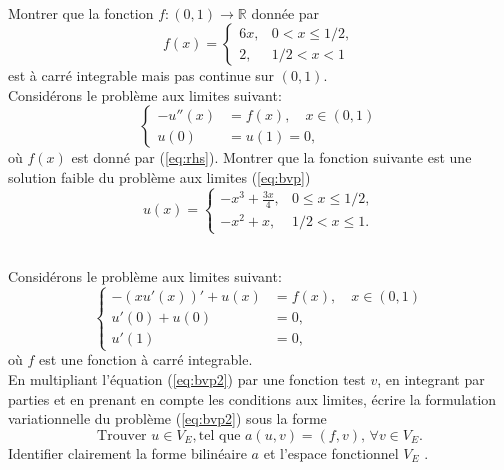 \documentclass[12pt,a4paper]{article}
\begin{document}
 \\ 
 Montrer que la fonction $f: (0,1)\rightarrow \mathbb{R}$ donnée par
 \begin{equation}\label{eq:rhs}
 f(x) = \left\{\begin{array}{rl}
 6x,& 0 <  x\le 1/2,\\
 2, &1/2 <x < 1
 \end{array}\right.
 \end{equation}
est à carré integrable mais pas continue sur $(0,1)$.\\
Considérons le problème aux limites suivant:
 \begin{equation}\label{eq:bvp}
\left\{\begin{array}{rl}
-u''(x) &= f(x), \quad x\in (0,1)\\
 u(0) &= u(1) = 0,
 \end{array}\right.
 \end{equation}
 où $f(x)$ est donné par (\ref{eq:rhs}). 
Montrer que la fonction suivante est une solution faible du problème aux limites (\ref{eq:bvp}) 
\begin{equation}\label{eq:sol}
 u(x) = \left\{\begin{array}{rl}
 -x^3 +\frac{3x}{4}, & 0 \le  x\le 1/2,\\
 -x^2+x, & 1/2 <x \le 1.
  \end{array}\right.
 \end{equation}

 \\ 
Considérons le problème aux limites suivant:
 \begin{equation}\label{eq:bvp2}
\left\{\begin{array}{rl}
-(xu'(x))' + u(x) &= f(x), \quad x\in (0,1)\\
 u'(0)+u(0) &= 0,\\
 u'(1) &= 0,
 \end{array}\right.
 \end{equation}
 où $f$ est une fonction à carré integrable.\\
En multipliant l'équation (\ref{eq:bvp2}) par une fonction test $v$, en integrant par parties et en prenant en compte les conditions aux limites, écrire la formulation variationnelle du problème (\ref{eq:bvp2}) sous la forme
$$
\mbox{Trouver } u\in V_E, \mbox{tel que } a(u,v) = (f,v),\, \forall v\in V_E.
$$
Identifier clairement la forme bilinéaire $a$ et l'espace fonctionnel $V_E$ .
\end{document}
